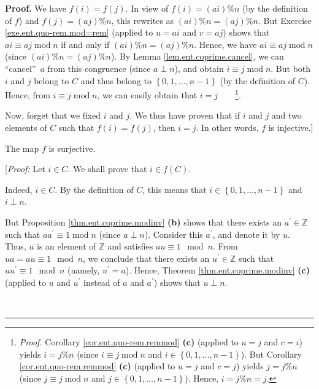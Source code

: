 \documentclass[numbers=enddot,12pt,final,onecolumn,notitlepage]{scrartcl}%
\numberwithin{exer}{subsection}
\theoremstyle{definition}
\newenvironment{proof}[1][Proof]{\noindent\textbf{#1.} }{\ \rule{0.5em}{0.5em}}
\begin{document}
\begin{proof}
We have $f\left(  i\right)  =f\left(  j\right)  $. In view of $f\left(
i\right)  =\left(  ai\right)  \%n$ (by the definition of $f$) and $f\left(
j\right)  =\left(  aj\right)  \%n$, this rewrites as $\left(  ai\right)
\%n=\left(  aj\right)  \%n$. But Exercise \ref{exe.ent.quo-rem.mod=rem}
(applied to $u=ai$ and $v=aj$) shows that $ai\equiv aj\operatorname{mod}n$ if
and only if $\left(  ai\right)  \%n=\left(  aj\right)  \%n$. Hence, we have
$ai\equiv aj\operatorname{mod}n$ (since $\left(  ai\right)  \%n=\left(
aj\right)  \%n$). By Lemma \ref{lem.ent.coprime.cancel}, we can
\textquotedblleft cancel\textquotedblright\ $a$ from this congruence (since
$a\perp n$), and obtain $i\equiv j\operatorname{mod}n$. But both $i$ and $j$
belong to $C$ and thus belong to $\left\{  0,1,\ldots,n-1\right\}  $ (by the
definition of $C$). Hence, from $i\equiv j\operatorname{mod}n$, we can easily
obtain that $i=j$\ \ \ \ \footnote{\textit{Proof.} Corollary
\ref{cor.ent.quo-rem.remmod} \textbf{(c)} (applied to $u=j$ and $c=i$) yields
$i=j\%n$ (since $i\equiv j\operatorname{mod}n$ and $i\in\left\{
0,1,\ldots,n-1\right\}  $). But Corollary \ref{cor.ent.quo-rem.remmod}
\textbf{(c)} (applied to $u=j$ and $c=j$) yields $j=j\%n$ (since $j\equiv
j\operatorname{mod}n$ and $j\in\left\{  0,1,\ldots,n-1\right\}  $). Hence,
$i=j\%n=j$.}.

Now, forget that we fixed $i$ and $j$. We thus have proven that if $i$ and $j$
and two elements of $C$ such that $f\left(  i\right)  =f\left(  j\right)  $,
then $i=j$. In other words, $f$ is injective.]

The map $f$ is surjective.

[\textit{Proof:} Let $i\in C$. We shall prove that $i\in f\left(  C\right)  $.

Indeed, $i\in C$. By the definition of $C$, this means that $i\in\left\{
0,1,\ldots,n-1\right\}  $ and $i\perp n$.

But Proposition \ref{thm.ent.coprime.modinv} \textbf{(b)} shows that there
exists an $a^{\prime}\in\mathbb{Z}$ such that $aa^{\prime}\equiv
1\operatorname{mod}n$ (since $a\perp n$). Consider this $a^{\prime}$, and
denote it by $u$. Thus, $u$ is an element of $\mathbb{Z}$ and satisfies
$au\equiv1\mod n$. From $ua=au\equiv1\mod n$, we conclude that there exists an
$u^{\prime}\in\mathbb{Z}$ such that $uu^{\prime}\equiv1\mod n$ (namely,
$u^{\prime}=a$). Hence, Theorem \ref{thm.ent.coprime.modinv} \textbf{(c)}
(applied to $u$ and $u^{\prime}$ instead of $a$ and $a^{\prime}$) shows that
$u\perp n$.


\end{proof}
\end{document}
